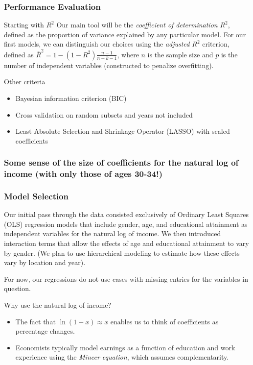 \documentclass{beamer}
\let\olditem=\item
\renewcommand{\item}{\olditem \justifying}
\begin{document}
\frame %
{
  \frametitle{Performance Evaluation}
  
  \begin{block}{Starting with $R^2$}
  Our main tool will be the \emph{coefficient of determination} $R^2$, defined as the proportion of variance explained by any particular model. For our first models, we can distinguish our choices using the \emph{adjusted $R^2$} criterion, defined as 
  $\bar{R}^2 = 1 - (1-R^2) \frac{n-1}{n-k-1}$, where $n$ is the sample size and $p$ is the number of independent variables (constructed to penalize overfitting). 
  \end{block}
  
  \begin{block}{Other criteria}
  \begin{itemize}
  \item Bayesian information criterion (BIC)
  \item Cross validation on random subsets and years not included
  \item Least Absolute Selection and Shrinkage Operator (LASSO) with scaled coefficients
  \end{itemize}
  \end{block}
  
  }
  

  
  \frame %
  {
  \frametitle{Some sense of the size of coefficients for the natural log of income (with only those of ages 30-34!)}
  
  

  
  }
  



\frame %
{
  \frametitle{Model Selection}
  Our initial pass through the data consisted exclusively of Ordinary Least Squares (OLS) regression models that include gender, age, and educational attainment as independent variables for the natural log of income. We then introduced interaction terms that allow the effects of age and educational attainment to vary by gender. (We plan to use hierarchical modeling to estimate how these effects vary by location and year). \newline
  
  \begin{small}
  For now, our regressions do not use cases with missing entries for the variables in question.  
  \end{small}
  
  \begin{block}{Why use the natural log of income?}
  \begin{itemize}
  \item The fact that $\ln(1+x) \approx x$ enables us to think of coefficients as percentage changes.
  \item Economists typically model earnings as a function of education and work experience using the \emph{Mincer equation}, which assumes complementarity.
  \end{itemize}
  \end{block}
  
  }
\end{document}
